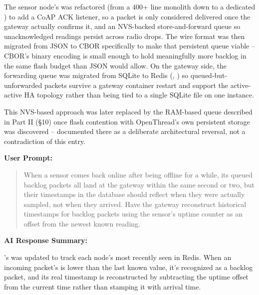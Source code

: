 \documentclass[conference]{IEEEtran}
\begin{document}
The sensor node's \texttt{} was refactored (from a 400+ line monolith down to a dedicated \texttt{}) to add a CoAP ACK listener, so a packet is only considered delivered once the gateway actually confirms it, and an NVS-backed store-and-forward queue so unacknowledged readings persist across radio drops. The wire format was then migrated from JSON to CBOR specifically to make that persistent queue viable -- CBOR's binary encoding is small enough to hold meaningfully more backlog in the same flash budget than JSON would allow. On the gateway side, the forwarding queue was migrated from SQLite to Redis (\texttt{}, \texttt{}) so queued-but-unforwarded packets survive a gateway container restart and support the active-active HA topology rather than being tied to a single SQLite file on one instance.

This NVS-based approach was later replaced by the RAM-based queue described in Part II (\S10) once flash contention with OpenThread's own persistent storage was discovered -- documented there as a deliberate architectural reversal, not a contradiction of this entry.

\par\vspace{4pt}\par\vspace{2pt}

\noindent\textbf{User Prompt:}\par

\begin{quote}
When a sensor comes back online after being offline for a while, its queued backlog packets all land at the gateway within the same second or two, but their timestamps in the database should reflect when they were actually sampled, not when they arrived. Have the gateway reconstruct historical timestamps for backlog packets using the sensor's uptime counter as an offset from the newest known reading.
\end{quote}

\noindent\textbf{AI Response Summary:}\par

\texttt{}'s \texttt{} was updated to track each node's most recently seen \texttt{} in Redis. When an incoming packet's \texttt{} is lower than the last known value, it's recognized as a backlog packet, and its real timestamp is reconstructed by subtracting the uptime offset from the current time rather than stamping it with arrival time.
\end{document}
